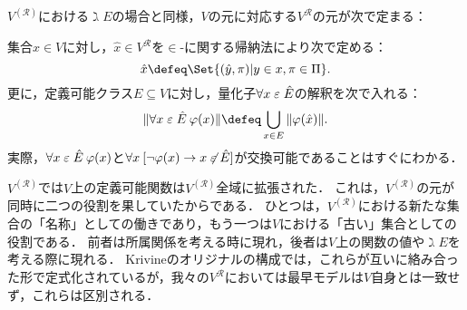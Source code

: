\documentclass[realisability.tex]{subfiles}
\begin{document}
$V^{(\mathcal{R})}$における$\gimel E$の場合と同様，$V$の元に対応する$V^{\mathcal{R}}$の元が次で定まる：
\begin{definition}
 集合$x \in V$に対し，$\hat{x} \in V^{\mathcal{R}}$を$\in$-に関する帰納法により次で定める：
 \[
  \hat{x} \defeq \Set{(\hat{y}, \pi) | y \in x, \pi \in \Pi}.
 \]
 更に，定義可能クラス$E \subseteq V$に対し，量化子$\forall x \mathrel{\varepsilon} \hat{E}$の解釈を次で入れる：
 \[
  \| \forall x \strin \hat{E} \: \varphi(x)\| \defeq \bigcup_{x \in E} \|\varphi(\hat{x})\|.
 \]
 実際，$\forall x \mathrel{\varepsilon} \hat{E}\: \varphi(x)$と$\forall x\:[\neg \varphi(x) \to x \not\mathrel{\varepsilon} \hat{E}]$が交換可能であることはすぐにわかる．
\end{definition}
$V^{(\mathcal{R})}$では$V$上の定義可能関数は$V^{(\mathcal{R})}$全域に拡張された．
これは，$V^{(\mathcal{R})}$の元が同時に二つの役割を果していたからである．
ひとつは，$V^{(\mathcal{R})}$における新たな集合の「名称」としての働きであり，もう一つは$V$における「古い」集合としての役割である．
前者は所属関係を考える時に現れ，後者は$V$上の関数の値や$\gimel E$を考える際に現れる．
Krivineのオリジナルの構成では，これらが互いに絡み合った形で定式化されているが，我々の$V^{\mathcal{R}}$においては最早モデルは$V$自身とは一致せず，これらは区別される．
\end{document}
